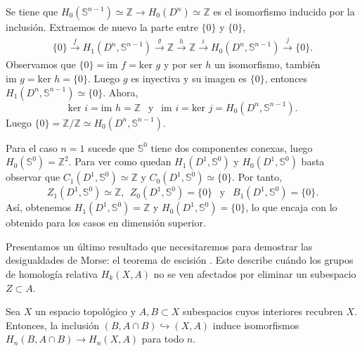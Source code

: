 \begin{example}

Se tiene que $H_{0}(\mathbb{S}^{n-1})\simeq \mathbb{Z}\to H_{0}(D^n)\simeq \mathbb{Z}$ es el isomorfismo inducido por la inclusión. Extraemos de nuevo la parte entre $\{0\}$ y $\{0\}$,
\begin{align*}
    \{0\}\overset{f}{\longrightarrow} H_1(D^n,\mathbb{S}^{n-1}) \overset{g}{\longrightarrow} \mathbb{Z} \overset{h}{\longrightarrow} \mathbb{Z} \overset{i}{\longrightarrow} H_0(D^n,\mathbb{S}^{n-1}) \overset{j}{\longrightarrow} \{0\}.
\end{align*}
Observamos que $\{0\} = \text{im }f = \text{ker }g$ y por ser $h$ un isomorfismo, también $\text{im }g = \text{ker }h = \{0\}$. Luego $g$ es inyectiva y su imagen es $\{0\}$, entonces $H_1(D^n,\mathbb{S}^{n-1})\simeq\{0\}$. Ahora, 
\begin{equation*}
    \text{ker }i = \text{im }h = \mathbb{Z} ~~\text{ y }~~ \text{im }i = \text{ker }j = H_0(D^n,\mathbb{S}^{n-1}).
\end{equation*}
Luego $\{0\}=\mathbb{Z}/\mathbb{Z}\simeq H_0(D^n,\mathbb{S}^{n-1})$.

Para el caso $n=1$ sucede que $\mathbb{S}^0$ tiene dos componentes conexas, luego $H_0(\mathbb{S}^0)=\mathbb{Z}^2$. Para ver como quedan $H_1(D^1,\mathbb{S}^{0})$ y $H_0(D^1,\mathbb{S}^{0})$ basta observar que $C_1(D^1,\mathbb{S}^0)\simeq \mathbb{Z}$ y $C_0(D^1,\mathbb{S}^0)\simeq \{0\}$. Por tanto, 
\begin{equation*}
    Z_1(D^1,\mathbb{S}^0)\simeq \mathbb{Z}, ~~Z_0(D^1,\mathbb{S}^0)=\{0\} ~~\text{ y }~~ B_1(D^1,\mathbb{S}^0)=\{0\}.
\end{equation*}
Así, obtenemos $H_1(D^1,\mathbb{S}^{0})=\mathbb{Z}$ y $H_0(D^1,\mathbb{S}^{0})=\{0\}$, lo que encaja con lo obtenido para los casos en dimensión superior.

\end{example}

\bigskip
Presentamos un último resultado que necesitaremos para demostrar las desigualdades de Morse: el teorema de escisión \cite[p.~119]{hatcher2002}. Este describe cuándo los grupos de homología relativa $H_k(X,A)$ no se ven afectados por eliminar un subespacio $Z\subset A$.

\begin{theorem}
\label{escision}
    Sea $X$ un espacio topológico y $A,B\subset X$ subespacios cuyos interiores recubren $X$. Entonces, la inclusión $(B,A\cap B)\hookrightarrow (X,A)$ induce isomorfismos $H_n(B,A\cap B)\to H_n(X,A)$ para todo $n$.
\end{theorem}

